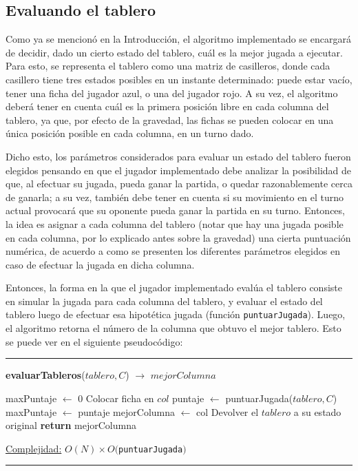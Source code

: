 \documentclass[12pt,a4paper]{article}
\makeatletter
\newenvironment{breakablealgorithm}
  {%
   \begin{flushleft}
     \refstepcounter{algorithm}%
     \hrule height.8pt depth0pt \kern2pt%
     \renewcommand{\caption}[2][\relax]{%
       {\raggedright\textbf{\ALG@name~\thealgorithm} ##2\par}%
       \ifx\relax##1\relax %
         \addcontentsline{loa}{algorithm}{\protect\numberline{\thealgorithm}##2}%
       \else %
         \addcontentsline{loa}{algorithm}{\protect\numberline{\thealgorithm}##1}%
       \fi
       \kern2pt\hrule\kern2pt
     }
  }{%
     \kern2pt\hrule\relax%
   \end{flushleft}
  }
\makeatother
\begin{document}
	
	\subsection{Evaluando el tablero}
		
    Como ya se mencionó en la Introducción, el algoritmo implementado se encargará de decidir, dado un cierto estado del tablero, cuál es la mejor jugada a ejecutar. Para esto, se representa el tablero como una matriz de casilleros, donde cada casillero tiene tres estados posibles en un instante determinado: puede estar vacío, tener una ficha del jugador azul, o una del jugador rojo. A su vez, el algoritmo deberá tener en cuenta cuál es la primera posición libre en cada columna del tablero, ya que, por efecto de la gravedad, las fichas se pueden colocar en una única posición posible en cada columna, en un turno dado.
    
    Dicho esto, los parámetros considerados para evaluar un estado del tablero fueron elegidos pensando en que el jugador implementado debe analizar la posibilidad de que, al efectuar su jugada, pueda ganar la partida, o quedar razonablemente cerca de ganarla; a su vez, también debe tener en cuenta si su movimiento en el turno actual provocará que su oponente pueda ganar la partida en su turno. Entonces, la idea es asignar a cada columna del tablero (notar que hay una jugada posible en cada columna, por lo explicado antes sobre la gravedad) una cierta puntuación numérica, de acuerdo a como se presenten los diferentes parámetros elegidos en caso de efectuar la jugada en dicha columna.
    
    Entonces, la forma en la que el jugador implementado evalúa el tablero consiste en simular la jugada para cada columna del tablero, y evaluar el estado del tablero luego de efectuar esa hipotética jugada (función \texttt{puntuarJugada}). Luego, el algoritmo retorna el número de la columna que obtuvo el mejor tablero. Esto se puede ver en el siguiente pseudocódigo:
    
    \begin{breakablealgorithm}{\textbf{evaluarTableros}($tablero, C$) $\to$ $mejorColumna$}
    \begin{algorithmic}[1]
		\State maxPuntaje $\gets$ 0     
		        
		    \State Colocar ficha en $col$       
		    \State puntaje $\gets$ puntuarJugada($tablero, C$)     
		         
		        \State maxPuntaje $\gets$ puntaje        
		        \State mejorColumna $\gets$ col         
		    \EndIf
		    \State Devolver el $tablero$ a su estado original       
        \EndFor
        \State \textbf{return} mejorColumna
        
        \medskip
		\Statex \underline{Complejidad:} $O(N) \times O($\texttt{puntuarJugada}$)$
    \end{algorithmic}
    \end{breakablealgorithm}
    
\end{document}
